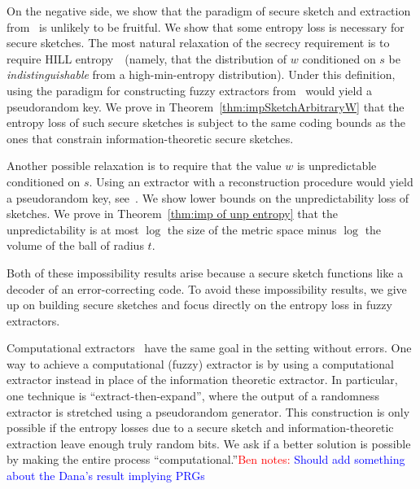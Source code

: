 \documentclass[11pt]{article}
\newcommand{\thref}[1]{\mbox{Theorem~\ref{#1}}}
\newcommand{\class}[1]{{\ensuremath{\mathsf{#1}}}}
\newcommand{\rec}{\ensuremath{\class{Rec}}\xspace}
\newcommand{\authnote}[2]{{\textcolor{red}{\textsf{#1 notes: }\textcolor{blue}{ #2}}\marginpar{\textcolor{red}{\textbf{!!!!!}}}}}
\newcommand{\authnote}[2]{}
\newcommand{\bnote}[1]{{\authnote{Ben}{#1}}}
\newcommand{\recout}{x}
\begin{document}
On the negative side, we show that the paradigm of secure sketch and extraction from~\cite{DBLP:journals/siamcomp/DodisORS08} is unlikely to be fruitful.  We show that some entropy loss is necessary for secure sketches.
The most natural relaxation of the secrecy requirement is to require HILL entropy~\cite{DBLP:journals/siamcomp/HastadILL99}~(namely, that the distribution of $w$ conditioned on $s$ be \emph{indistinguishable} from a high-min-entropy distribution).  Under this definition, using the paradigm for constructing fuzzy extractors from~\cite{DBLP:journals/siamcomp/DodisORS08} would yield a pseudorandom key.  We prove in Theorem~\ref{thm:impSketchArbitraryW} that the entropy loss of such secure sketches is subject to the same coding bounds as the ones that constrain information-theoretic secure sketches.  

Another possible relaxation is to require that the value $w$ is unpredictable conditioned on $s$.  Using an extractor with a reconstruction procedure would yield a pseudorandom key, see~\cite[Lemma 6]{DBLP:conf/eurocrypt/HsiaoLR07}.  We show lower bounds on the unpredictability loss of sketches.  We prove in \thref{thm:imp of unp entropy} that the unpredictability is at most $\log$ the size of the metric space minus $\log$ the volume of the ball of radius $t$.  

Both of these impossibility results arise because a secure sketch functions like a decoder of an error-correcting code.  To avoid these impossibility results, we give up on building secure sketches and focus directly on the entropy loss in fuzzy extractors.  

Computational extractors~\cite{krawczyk2010cryptographic, dachman2012computational} have the same goal in the setting without errors.  One way to achieve a computational (fuzzy) extractor is by using a computational extractor instead in place of the information theoretic extractor.  In particular, one technique is ``extract-then-expand'', where the output of a randomness extractor is stretched using a pseudorandom generator.  This construction is only possible if the entropy losses due to a secure sketch and information-theoretic extraction leave enough truly random bits.  We ask if a better solution is possible by making the entire process ``computational.''\bnote{Should add something about the Dana's result implying PRGs}
\end{document}
